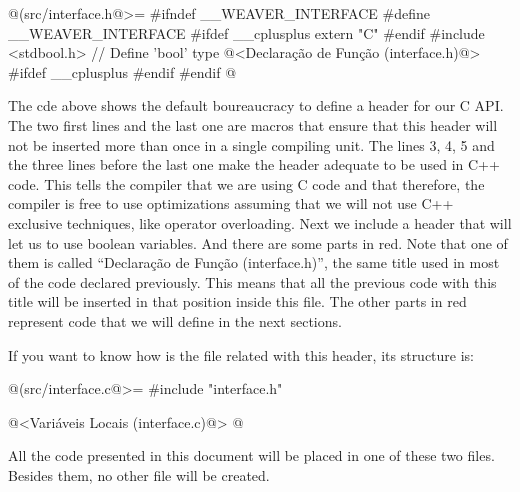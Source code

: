 \iniciocodigo
@(src/interface.h@>=
#ifndef __WEAVER_INTERFACE
#define __WEAVER_INTERFACE
#ifdef __cplusplus
extern "C" {
#endif
#include <stdbool.h> // Define  'bool' type
@<Declaração de Função (interface.h)@>
#ifdef __cplusplus
}
#endif
#endif
@
\fimcodigo

The cde above shows the default boureaucracy to define a header for
our C API. The two first lines and the last one are macros that ensure
that this header will not be inserted more than once in a single
compiling unit. The lines 3, 4, 5 and the three lines before the last
one make the header adequate to be used in C++ code. This tells the
compiler that we are using C code and that therefore, the compiler is
free to use optimizations assuming that we will not use C++ exclusive
techniques, like operator overloading. Next we include a header that
will let us to use boolean variables. And there are some parts in
red. Note that one of them is called ``Declaração de Função
(interface.h)'', the same title used in most of the code declared
previously. This means that all the previous code with this title will
be inserted in that position inside this file. The other parts in red
represent code that we will define in the next sections.

If you want to know how is the  file related
with this header, its structure is:

\iniciocodigo
@(src/interface.c@>=
#include "interface.h"

@<Variáveis Locais (interface.c)@>
@
\fimcodigo

All the code presented in this document will be placed in one of these
two files. Besides them, no other file will be created.












\fim
